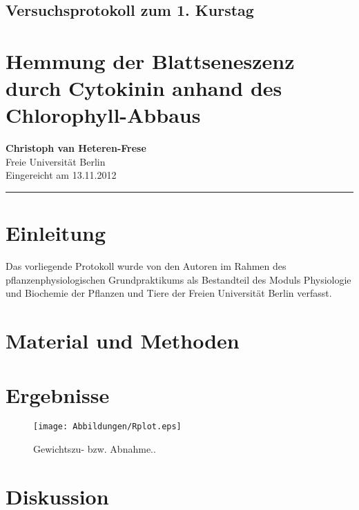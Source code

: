 \documentclass[11pt,a4paper,DIV=10,]{scrartcl}
\begin{document}
\onecolumn
\subsection*{Versuchsprotokoll zum 1. Kurstag }
\section*{Hemmung der Blattseneszenz durch Cytokinin anhand des Chlorophyll-Abbaus}
\textbf{Christoph van Heteren-Frese\footnotemark[1]} \\[0.1cm]
\footnotemark[1]Freie Universität Berlin\\[0.2cm]
Eingereicht am 13.11.2012\\
\hrule

\section*{Einleitung}    
Das vorliegende Protokoll wurde von den Autoren im Rahmen des pflanzenphysiologischen Grundpraktikums als Bestandteil des Moduls Physiologie und Biochemie der Pflanzen und Tiere der Freien Universität Berlin verfasst. 


\section*{Material und Methoden}
%

\section*{Ergebnisse}

\begin{figure}[H]
\center
\captionsetup{width=1\textwidth}	
\texttt{[image: Abbildungen/Rplot.eps]}
\caption{Gewichtszu- bzw. Abnahme..}
\label{v1}
\end{figure}

\section*{Diskussion}
\end{document}
